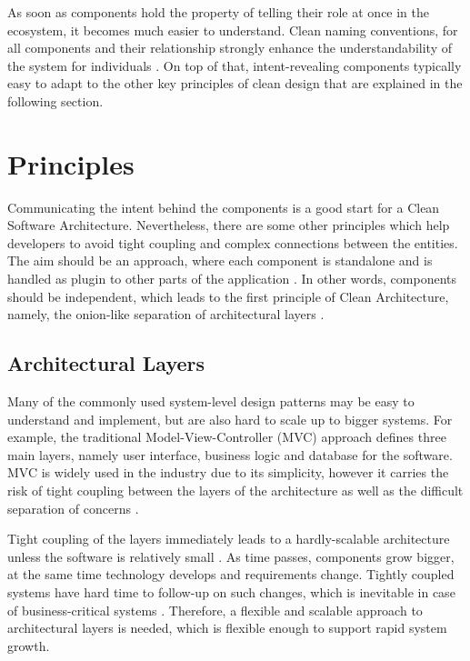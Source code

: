 \documentclass[conference]{IEEEtran}
\begin{document}
As soon as components hold the property of telling their role at once in the ecosystem, it becomes much easier to understand. Clean naming conventions, for all components and their relationship strongly enhance the understandability of the system for individuals \cite{cleancode}. On top of that, intent-revealing components typically easy to adapt to the other key principles of clean design that are explained in the following section.

\section{Principles}
Communicating the intent behind the components is a good start for a Clean Software Architecture. Nevertheless, there are some other principles which help developers to avoid tight coupling and complex connections between the entities. The aim should be an approach, where each component is standalone and is handled as plugin to other parts of the application \cite{cleancode} \cite{cleanarchitecture}. In other words, components should be independent, which leads to the first principle of Clean Architecture, namely, the onion-like separation of architectural layers \cite{cleanarchitecture}. 

\subsection{Architectural Layers}
Many of the commonly used system-level design patterns may be easy to understand and implement, but are also hard to scale up to bigger systems. For example, the traditional Model-View-Controller (MVC) approach defines three main layers, namely user interface, business logic and database for the software. MVC is widely used in the industry due to its simplicity, however it carries the risk of tight coupling between the layers of the architecture as well as the difficult separation of concerns \cite{onionarchitecture}. 

Tight coupling of the layers immediately leads to a hardly-scalable architecture unless the software is relatively small \cite{onionarchitecture}. As time passes, components grow bigger, at the same time technology develops and requirements change. Tightly coupled systems have hard time to follow-up on such changes, which is inevitable in case of business-critical systems \cite{onionarchitecture}. Therefore, a flexible and scalable approach to architectural layers is needed, which is flexible enough to support rapid system growth. 
\end{document}
